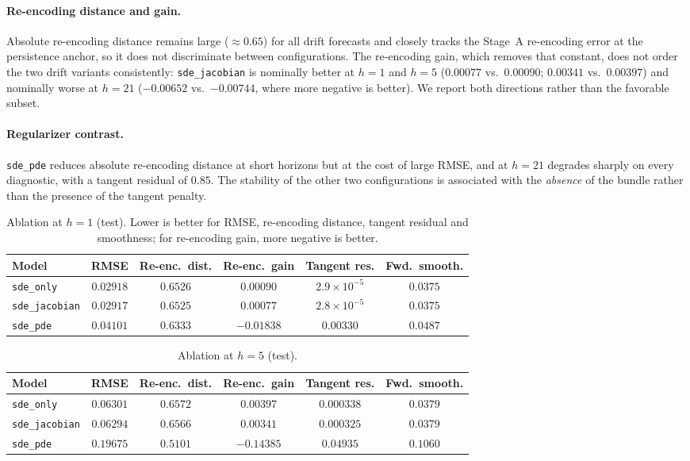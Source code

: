 \documentclass{article} %
\begin{document}
\paragraph{Re-encoding distance and gain.} Absolute re-encoding distance remains
large ($\approx0.65$) for all drift forecasts and closely tracks the Stage~A
re-encoding error at the persistence anchor, so it does not discriminate between
configurations. The
re-encoding gain, which removes that constant, does not order the two drift variants
consistently: \texttt{sde\_jacobian} is nominally better at $h{=}1$ and $h{=}5$
($0.00077$ vs.\ $0.00090$; $0.00341$ vs.\ $0.00397$) and nominally worse at $h{=}21$
($-0.00652$ vs.\ $-0.00744$, where more negative is better). We report both
directions rather than the favorable subset.
\paragraph{Regularizer contrast.} \texttt{sde\_pde} reduces absolute re-encoding
distance at short horizons but at the cost of large RMSE, and at $h{=}21$ degrades
sharply on every diagnostic, with a tangent residual of $0.85$. The stability of the
other two configurations is associated with the \emph{absence} of the bundle rather
than the presence of the tangent penalty.
\begin{table}[t]
  \centering
  \caption{Ablation at $h{=}1$ (test). Lower is better for RMSE, re-encoding
  distance, tangent residual and smoothness; for re-encoding gain, more negative is
  better.}
  \label{tab:geom-h1}
  \setlength{\tabcolsep}{4pt}
  \begin{tabular}{@{}lccccc@{}}
    \toprule
    Model & RMSE & Re-enc.\ dist. & Re-enc.\ gain & Tangent res. & Fwd.\ smooth. \\
    \midrule
    \texttt{sde\_only}
      & $0.02918$ & $0.6526$ & $0.00090$ & $2.9\!\times\!10^{-5}$ & $0.0375$ \\
    \texttt{sde\_jacobian}
      & $0.02917$ & $0.6525$ & $0.00077$ & $2.8\!\times\!10^{-5}$ & $0.0375$ \\
    \texttt{sde\_pde}
      & $0.04101$ & $0.6333$ & $-0.01838$ & $0.00330$ & $0.0487$ \\
    \bottomrule
  \end{tabular}
\end{table}
\begin{table}[t]
  \centering
  \caption{Ablation at $h{=}5$ (test).}
  \label{tab:geom-h5}
  \setlength{\tabcolsep}{4pt}
  \begin{tabular}{@{}lccccc@{}}
    \toprule
    Model & RMSE & Re-enc.\ dist. & Re-enc.\ gain & Tangent res. & Fwd.\ smooth. \\
    \midrule
    \texttt{sde\_only}
      & $0.06301$ & $0.6572$ & $0.00397$ & $0.000338$ & $0.0379$ \\
    \texttt{sde\_jacobian}
      & $0.06294$ & $0.6566$ & $0.00341$ & $0.000325$ & $0.0379$ \\
    \texttt{sde\_pde}
      & $0.19675$ & $0.5101$ & $-0.14385$ & $0.04935$ & $0.1060$ \\
    \bottomrule
  \end{tabular}
\end{table}
\end{document}
